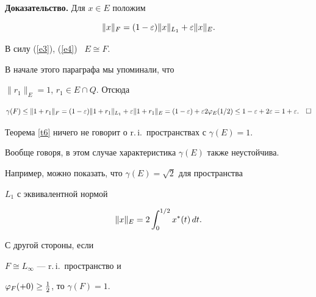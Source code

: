 {\bf Доказательство.} Для $x\in E$ положим


$$


\|x\|_F = (1- \eps) \|x\|_{L_1} + \eps \|x\|_E.


$$


В силу (\ref{e3}), (\ref{e4}) \ $E \cong F$. 


В начале этого параграфа мы упоминали, что 


$\|r_1\|_E =1$, $r_1 \in E \cap Q$. Отсюда


$$


\gamma(F) \le \|1 + r_1\|_F = (1- \eps) \|1 + r_1\|_{L_1} + 


\eps\|1 + r_1\|_E = 


(1- \eps ) + \eps 2 \ph_E (1/2) \le 1 - \eps + 2 \eps = 1 + \eps. \quad


\square


$$





Теорема \ref{t6} ничего не говорит о r.\,i.\ пространствах с $\gamma(E)=1$. 


Вообще говоря, в этом случае характеристика $\gamma(E)$ также неустойчива.


Например, можно показать, что $\gamma(E) = \sqrt 2$ для пространства


$L_1$ с эквивалентной нормой


$$


\|x\|_E = 2 \intl{0}{1/2} x^* (t)\, dt.


$$


С другой стороны, если


$F \cong L_\infty$ --- r.\,i.\ пространство и 


$\varphi_F (+0) \ge \frac 1 2$, то $\gamma(F) =1$. 








